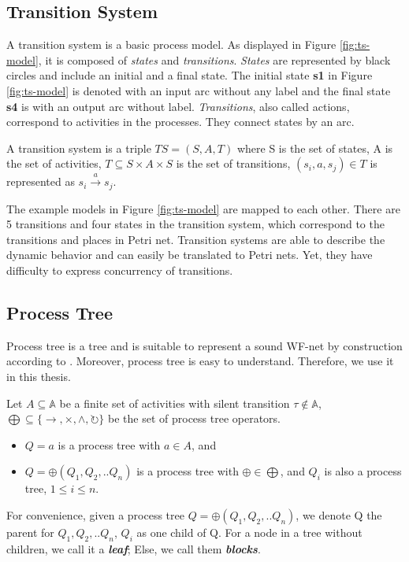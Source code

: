 \subsection{Transition System}
A transition system is a basic process model. As displayed in Figure \ref{fig:ts-model}, it is composed of \emph{states} and \emph{transitions}. \emph{States} are represented by black circles and include an initial and a final state. The initial state \textbf{s1} in Figure \ref{fig:ts-model} is denoted with an input arc without any label and the final state \textbf{s4} is with an output arc without label. \emph{Transitions}, also called actions, correspond to activities in the processes. They connect states by an arc.  
\begin{definition}
	A transition system is a triple $TS=(S,A,T)$ where S is the set of states, A is the set of activities, $T \subseteq S\times A\times S $ is the set of transitions, $(s_i, a, s_j) \in T$ is represented as $s_i \xrightarrow{a} s_j$.  
\end{definition}
The example models in Figure \ref{fig:ts-model} are mapped to each other. There are 5 transitions and four states in the transition system, which correspond to the transitions and places in Petri net. Transition systems are able to describe the dynamic behavior and can easily be translated to Petri nets. Yet, they have difficulty to express concurrency of transitions.  %
\subsection{Process Tree}
Process tree is a tree and is suitable to represent a sound WF-net by construction according to \cite{van2016data}. Moreover, process tree is easy to understand. Therefore, we use it in this thesis.
\begin{definition}
Let $ A \subseteq \mathbb{A} $ be a finite set of activities with silent transition $\tau \notin \mathbb{A}$, $\bigoplus \subseteq \{\rightarrow, \times, \land, \circlearrowright\}$ be the set of process tree operators. 
\begin{itemize}
\item $Q=a$ is a process tree with $a\in A$, and 
\item $Q= \oplus (Q_1 , Q_2 ,.. Q_n)$ is a process tree with $\oplus \in \bigoplus$, and $Q_i$ is also a process tree, $ 1 \leq i \leq n$. 
\end{itemize}
\end{definition}
For convenience, given a process tree $Q= \oplus (Q_1 , Q_2 ,.. Q_n)$, we denote Q the parent for $Q_1 , Q_2 ,.. Q_n$, $Q_i$ as one child of Q. For a node in a tree without children, we call it a \textbf{\emph{leaf}}; Else, we call them \textbf{\emph{blocks}}.


